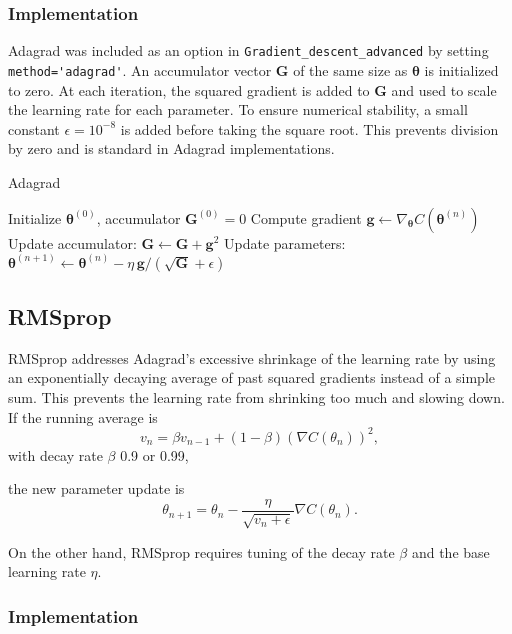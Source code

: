 \documentclass[
    article
 reprint,            %
 amsmath,amssymb,
 aps,
]{revtex4-2}
\begin{document}
\subsubsection{Implementation}

Adagrad was included as an option in \verb|Gradient_descent_advanced| by setting \verb|method='adagrad'|. An accumulator vector $\mathbf{G}$ of the same size as $\boldsymbol{\theta}$ is initialized to zero. At each iteration, the squared gradient is added to $\mathbf{G}$ and used to scale the learning rate for each parameter.
To ensure numerical stability, a small constant $\epsilon=10^{-8}$ is added before taking the square root. This prevents division by zero and is standard in Adagrad implementations.
\begin{algorithm}[H]
\caption{Adagrad}
\begin{algorithmic}[1]
\State Initialize $\boldsymbol{\theta}^{(0)}$, accumulator $\mathbf{G}^{(0)}=0$
\State Compute gradient $\mathbf{g} \gets \nabla_{\boldsymbol{\theta}} C(\boldsymbol{\theta}^{(n)})$
\State Update accumulator: $\mathbf{G} \gets \mathbf{G} + \mathbf{g}^2$
\State Update parameters: $\boldsymbol{\theta}^{(n+1)} \gets \boldsymbol{\theta}^{(n)} - \eta \, \mathbf{g} / (\sqrt{\mathbf{G}}+\epsilon)$
\EndFor
\end{algorithmic}
\end{algorithm}

\subsection{RMSprop}

RMSprop addresses Adagrad's excessive shrinkage of the learning rate by using an exponentially decaying average of past squared gradients instead of a simple sum\cite{hjorthjensen_week37}.
This prevents the learning rate from shrinking too much and slowing down.  
If the running average is
\[
v_n = \beta v_{n-1} + (1 - \beta)\left( \nabla C(\theta_n) \right)^2,
\]
with decay rate \(\beta\) 0.9 or 0.99,

the new parameter update is
\[\theta_{n+1} = \theta_n - \frac{\eta}{\sqrt{v_n + \epsilon}} \nabla C(\theta_n).
\]

On the other hand, RMSprop requires tuning of the decay rate \(\beta\) and the base learning rate \(\eta\). \cite{goodfellow2016}

\subsubsection{Implementation}
\end{document}
